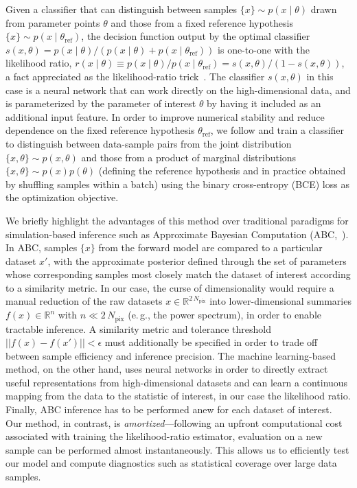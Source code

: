\documentclass[twocolumn]{aastex631}
\newcommand{\eg}{{e.\,g.}\xspace}
\begin{document}
Given a classifier that can distinguish between samples $\{x\} \sim p(x\mid\theta)$ drawn from parameter points $\theta$ and those from a fixed reference hypothesis $\{x\} \sim p(x\mid\theta_\mathrm{ref})$, the decision function output by the optimal classifier $s(x, \theta) = {p(x\mid\theta)}/{\left(p(x\mid\theta) + p(x\mid\theta_\mathrm{ref})\right)}$ is one-to-one with the likelihood ratio, $r(x\mid \theta) \equiv {p(x\mid\theta)}/{p(x\mid\theta_\mathrm{ref})}  = {s(x, \theta)}/{\left(1 - s(x, \theta)\right)}$, a fact appreciated as the likelihood-ratio trick~\citep{Cranmer:2015bka,mohamed2017learning}. 
The classifier $s(x, \theta)$ in this case is a neural network that can work directly on the high-dimensional data, and is parameterized by the parameter of interest $\theta$ by having it included as an additional input feature. In order to improve numerical stability and reduce dependence on the fixed reference hypothesis $\theta_\mathrm{ref}$, we follow \citet{Hermans:2019ioj} and train a classifier to distinguish between data-sample pairs from the joint distribution $\{x, \theta\} \sim p(x,\theta)$ and those from a product of marginal distributions $\{x, \theta\} \sim p(x)p(\theta)$ (defining the reference hypothesis and in practice obtained by shuffling samples within a batch) using the binary cross-entropy (BCE) loss as the optimization objective. 

{We briefly highlight the advantages of this method over traditional paradigms for simulation-based inference such as Approximate Bayesian Computation (ABC,~\citet{10.1214/aos/1176346785,sisson2018handbook}). In ABC, samples $\{x\}$ from the forward model are compared to a particular dataset $x'$, with the approximate posterior defined through the set of parameters whose corresponding samples most closely match the dataset of interest according to a similarity metric. In our case, the curse of dimensionality would require a manual reduction of the raw datasets $x\in\mathbb R^{2\,N_\mathrm{pix}}$ into lower-dimensional summaries $f(x)\in\mathbb R^{n}$ with $n \ll 2\,N_\mathrm{pix}$ (\eg, the power spectrum), in order to enable tractable inference. A similarity metric and tolerance threshold $||f(x)-f(x')|| < \epsilon$ must additionally be specified in order to trade off between sample efficiency and inference precision. The machine learning-based method, on the other hand, uses neural networks in order to directly extract useful representations from high-dimensional datasets and can learn a continuous mapping from the data to the statistic of interest, in our case the likelihood ratio. Finally, ABC inference has to be performed anew for each dataset of interest. Our method, in contrast, is \emph{amortized}---following an upfront computational cost associated with training the likelihood-ratio estimator, evaluation on a new sample can be performed almost instantaneously. This allows us to efficiently test our model and compute diagnostics such as statistical coverage over large data samples.}
\end{document}
